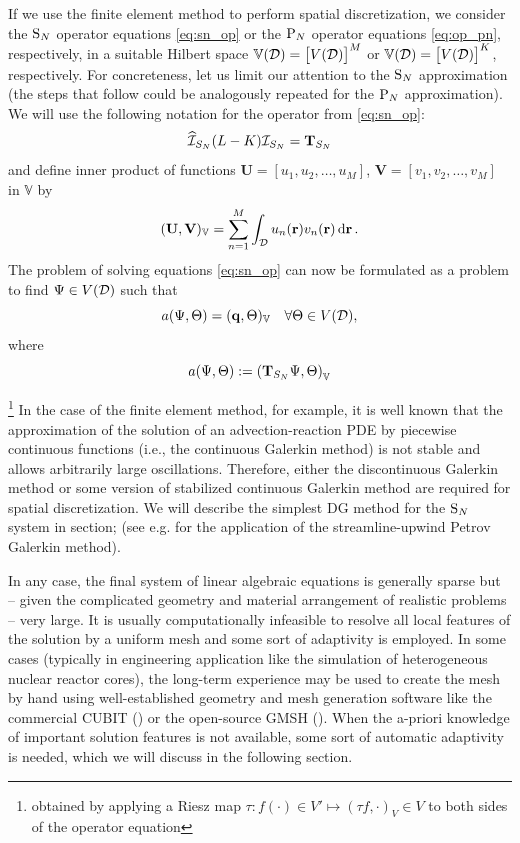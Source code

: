 If we use the finite element method to perform spatial discretization, we consider the $\SN$ operator equations 
\eqref{eq:sn_op} or the $\PN$ operator equations \eqref{eq:op_pn}, respectively, in a suitable Hilbert space
$\mathbb{V}(\VV) = \bigl[V(\VV)\bigr]^M$ or $\mathbb{V}(\VV) = \bigl[V(\VV)\bigr]^K$, respectively. For concreteness,
let us limit our attention to the $\SN$ approximation (the steps that follow could be analogously repeated for
the $\PN$ approximation). We will use the following notation for the operator from \eqref{eq:sn_op}:
$$
	\PihSN (L-K) \PiSN = \mat{T}_{S_N}
$$ 
and define inner product of functions $\mathbf{U} = [u_1,u_2,\ldots,u_M]$, $\mathbf{V} = [v_1,v_2,\ldots,v_M]$ in
$\mathbb{V}$ by 
$$
\ip{\mathbb{V}}{\mathbf{U},\mathbf{V}} = \sum_{n=1}^M \int_{\VV} u_n(\br) v_n(\br)\,\d{\br}.
$$
The problem of solving equations \eqref{eq:sn_op} can now be formulated as a problem
to find $\Psi \in V(\VV)$ such that
\begin{equation}\label{eq:weak1}
	a(\Psi,\Theta) = (\mat{q}, \Theta)_\mathbb{V} \quad \forall \Theta\in V(\VV),
\end{equation}
where
$$
	a(\Psi,\Theta) := \left(\mat{T}_{S_N} \Psi, \Theta\right)_\mathbb{V}
$$
  
\footnote{obtained by applying a Riesz map $\tau : f(\cdot)\in V' \mapsto (\tau f,\cdot)_V \in V$ to both sides of the
operator equation} In the case of the finite element method, for example, it is well known that the approximation of the
solution of an advection-reaction PDE by piecewise continuous functions (i.e., the continuous Galerkin method) is not
stable and allows arbitrarily large oscillations. Therefore, either the discontinuous Galerkin method or some version of
stabilized continuous Galerkin method are required for spatial discretization. We will describe the simplest DG method
for the $\SN$ system in \alert{section}; (see e.g. \cite{Meinkohn} for the application of the streamline-upwind Petrov
Galerkin method).


In any case, the final system of linear algebraic equations is generally sparse but -- given the complicated geometry
and material arrangement of realistic problems -- very large. It is usually computationally infeasible to resolve all
local features of the solution by a uniform mesh and some sort of adaptivity is employed. In some cases (typically in
engineering application like the simulation of heterogeneous nuclear reactor cores), the long-term experience may be
used to create the mesh by hand using well-established geometry and mesh generation software like the commercial CUBIT
(\cite{CUBIT}) or the open-source GMSH (\cite{GMSH}). When the a-priori knowledge of important solution features is not
available, some sort of automatic adaptivity is needed, which we will discuss in the following section.


